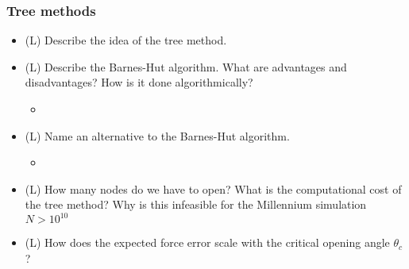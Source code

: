 \subsubsection*{Tree methods}
\begin{itemize}
    \item (L) Describe the idea of the tree method.
    \answerboxM
    \item (L) Describe the Barnes-Hut algorithm. What are advantages and disadvantages? How is it done algorithmically?
    \begin{itemize}
        \item {}
    \end{itemize}
    \answerboxM
    \item (L) Name an alternative to the Barnes-Hut algorithm.
    \begin{itemize}
        \item {}
    \end{itemize}
    \answerboxM
    \item (L) How many nodes do we have to open? What is the computational cost of the tree method? Why is this infeasible for the Millennium simulation $N > 10^{10}$
    \answerboxL
    \item (L) How does the expected force error scale with the critical opening angle $\theta_c$?
    \answerboxM
\end{itemize}

